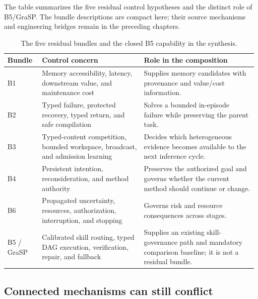 The table summarizes the five residual control hypotheses and the distinct role of B5/GraSP. The bundle descriptions are compact here; their source mechanisms and engineering bridges remain in the preceding chapters.

\begin{table}[htbp]
\centering
\small
\caption{The five residual bundles and the closed B5 capability in the synthesis.}
\label{tab:ch18-five-and-one}
\begin{tabularx}{\linewidth}{p{1.4cm}p{3.2cm}X}
\toprule
\textbf{Bundle} & \textbf{Control concern} & \textbf{Role in the composition} \\
\midrule
B1 & Memory accessibility, latency, downstream value, and maintenance cost & Supplies memory candidates with provenance and value/cost information. \\
B2 & Typed failure, protected recovery, typed return, and safe compilation & Solves a bounded in-episode failure while preserving the parent task. \\
B3 & Typed-content competition, bounded workspace, broadcast, and admission learning & Decides which heterogeneous evidence becomes available to the next inference cycle. \\
B4 & Persistent intention, reconsideration, and method authority & Preserves the authorized goal and governs whether the current method should continue or change. \\
B6 & Propagated uncertainty, resources, authorization, interruption, and stopping & Governs risk and resource consequences across stages. \\
B5 / GraSP & Calibrated skill routing, typed DAG execution, verification, repair, and fallback & Supplies an existing skill-governance path and mandatory comparison baseline; it is not a residual bundle. \\
\bottomrule
\end{tabularx}
\end{table}


\subsection{Connected mechanisms can still conflict}
\label{subsec:ch18-conflicts}

